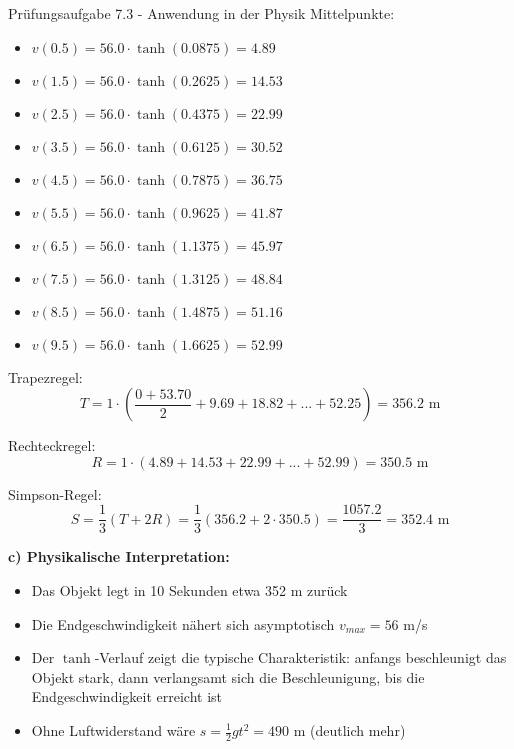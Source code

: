 \begin{example2}{Prüfungsaufgabe 7.3 - Anwendung in der Physik}
Mittelpunkte:
\begin{itemize}
    \item $v(0.5) = 56.0 \cdot \tanh(0.0875) = 4.89$
    \item $v(1.5) = 56.0 \cdot \tanh(0.2625) = 14.53$
    \item $v(2.5) = 56.0 \cdot \tanh(0.4375) = 22.99$
    \item $v(3.5) = 56.0 \cdot \tanh(0.6125) = 30.52$
    \item $v(4.5) = 56.0 \cdot \tanh(0.7875) = 36.75$
    \item $v(5.5) = 56.0 \cdot \tanh(0.9625) = 41.87$
    \item $v(6.5) = 56.0 \cdot \tanh(1.1375) = 45.97$
    \item $v(7.5) = 56.0 \cdot \tanh(1.3125) = 48.84$
    \item $v(8.5) = 56.0 \cdot \tanh(1.4875) = 51.16$
    \item $v(9.5) = 56.0 \cdot \tanh(1.6625) = 52.99$
\end{itemize}

Trapezregel:
$$T = 1 \cdot \left(\frac{0 + 53.70}{2} + 9.69 + 18.82 + ... + 52.25\right) = 356.2 \text{ m}$$

Rechteckregel:
$$R = 1 \cdot (4.89 + 14.53 + 22.99 + ... + 52.99) = 350.5 \text{ m}$$

Simpson-Regel:
$$S = \frac{1}{3}(T + 2R) = \frac{1}{3}(356.2 + 2 \cdot 350.5) = \frac{1057.2}{3} = 352.4 \text{ m}$$

\textbf{c) Physikalische Interpretation:}
\begin{itemize}
    \item Das Objekt legt in 10 Sekunden etwa 352 m zurück
    \item Die Endgeschwindigkeit nähert sich asymptotisch $v_{max} = 56$ m/s
    \item Der $\tanh$-Verlauf zeigt die typische Charakteristik: anfangs beschleunigt das Objekt stark, dann verlangsamt sich die Beschleunigung, bis die Endgeschwindigkeit erreicht ist
    \item Ohne Luftwiderstand wäre $s = \frac{1}{2}gt^2 = 490$ m (deutlich mehr)
\end{itemize}
\end{example2}

